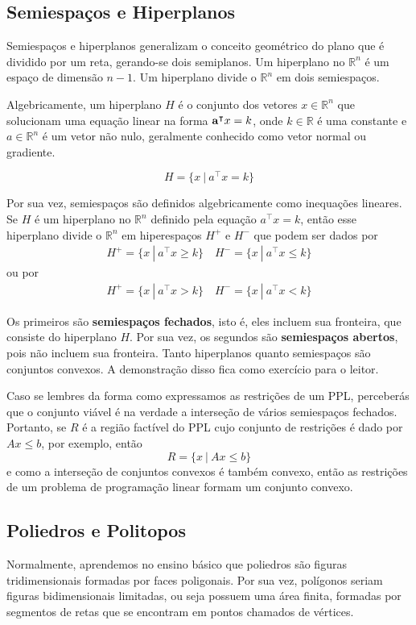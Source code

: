 \subsection{Semiespaços e Hiperplanos}
Semiespaços e hiperplanos generalizam o conceito geométrico do plano que é dividido por um reta, gerando-se dois semiplanos. Um hiperplano no $\mathbb{R}^n$ é um espaço de dimensão $n-1$. Um hiperplano divide o $\mathbb{R}^n$ em dois semiespaços. 

Algebricamente, um hiperplano $H$ é o conjunto dos vetores $x \in \mathbb{R}^n$ que solucionam uma equação linear na forma $\mathbf{a}^\intercal x = k$, onde $k \in \mathbb{R}$ é uma constante e $a \in \mathbb{R}^n$ é um vetor não nulo, geralmente conhecido como vetor normal ou gradiente.

\begin{equation*}
	H = \{x\ |\ a^\intercal x = k\}
\end{equation*} 

Por sua vez, semiespaços são definidos algebricamente como inequações lineares. Se $H$ é um hiperplano no $\mathbb{R}^n$ definido pela equação $a^\intercal x = k$, então esse hiperplano divide o $\mathbb{R}^n$ em hiperespaços $H^+$ e $H^-$ que podem ser dados por
\begin{align*}
	H^+ = \{x \ |\ a^\intercal x  \geq k\} \quad
	H^- = \{x \ |\ a^\intercal x  \leq k\} 
\end{align*}
ou por
\begin{align*}
	H^+ = \{x \ |\ a^\intercal x  > k\} \quad
	H^- = \{x \ |\ a^\intercal x  < k\} 
\end{align*}

Os primeiros são \textbf{semiespaços fechados}, isto é, eles incluem sua fronteira, que consiste do hiperplano $H$. Por sua vez, os segundos são \textbf{semiespaços abertos}, pois não incluem sua fronteira. Tanto hiperplanos quanto semiespaços são conjuntos convexos. A demonstração disso fica como exercício para o leitor.

Caso se lembres da forma como expressamos as restrições de um PPL, perceberás que o conjunto viável é na verdade a interseção de vários semiespaços fechados. Portanto, se $R$ é a região factível do PPL cujo conjunto de restrições é dado por $Ax \leq b$, por exemplo, então 
\[R = \{x \ | \ Ax \leq b\}\]
e como a interseção de conjuntos convexos é também convexo, então as restrições de um problema de programação linear formam um conjunto convexo.

\subsection{Poliedros e Politopos}
Normalmente, aprendemos no ensino básico que poliedros são figuras tridimensionais formadas por faces poligonais. Por sua vez, polígonos seriam figuras bidimensionais limitadas, ou seja possuem uma área finita, formadas por segmentos de retas que se encontram em pontos chamados de vértices.

